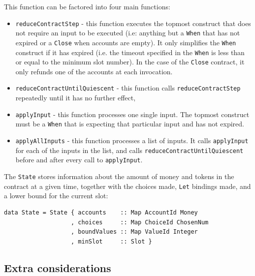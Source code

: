 \documentclass[english,runningheads]{llncs}
\begin{document}
This function can be factored into four main functions:
\begin{itemize}
\item \texttt{reduceContractStep} - this function executes the topmost
construct that does not require an input to be executed (i.e: anything
but a \texttt{When} that has not expired or a \texttt{Close} when
accounts are empty). It only simplifies the \texttt{When} construct
if it has expired (i.e. the timeout specified in the \texttt{When}
is less than or equal to the minimum slot number). In the case of
the \texttt{Close} contract, it only refunds one of the accounts at
each invocation.
\item \texttt{reduceContractUntilQuiescent} - this function calls \texttt{reduceContractStep}
repeatedly until it has no further effect,
\item \texttt{applyInput} - this function processes one single input.
The topmost construct must be a \texttt{When} that
is expecting that particular input and has not expired. 
\item \texttt{applyAllInputs} - this function processes a list of inputs.
It calls \texttt{applyInput} for each of the inputs in the list, and
calls \texttt{reduceContractUntilQuiescent} before and after every
call to \texttt{applyInput}.
\end{itemize}
The \texttt{State} stores information about the amount of money and
tokens in the contract at a given time, together with the choices
made, \texttt{Let} bindings made, and a lower bound for the current
slot:

\begin{verbatim}
data State = State { accounts    :: Map AccountId Money
                   , choices     :: Map ChoiceId ChosenNum
                   , boundValues :: Map ValueId Integer
                   , minSlot     :: Slot }
\end{verbatim}

\subsection{Extra considerations\label{subsec:Extra-considerations}}
\end{document}
